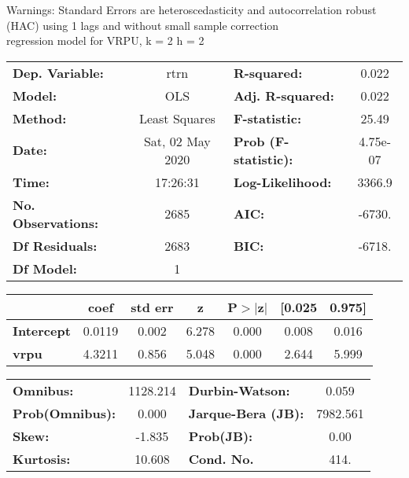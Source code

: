 Warnings: \newline
 [1] Standard Errors are heteroscedasticity and autocorrelation robust (HAC) using 1 lags and without small sample correction\\ 

regression model for VRPU, k = 2 h = 2\begin{center}
\begin{tabular}{lclc}
\toprule
\textbf{Dep. Variable:}    &       rtrn       & \textbf{  R-squared:         } &     0.022   \\
\textbf{Model:}            &       OLS        & \textbf{  Adj. R-squared:    } &     0.022   \\
\textbf{Method:}           &  Least Squares   & \textbf{  F-statistic:       } &     25.49   \\
\textbf{Date:}             & Sat, 02 May 2020 & \textbf{  Prob (F-statistic):} &  4.75e-07   \\
\textbf{Time:}             &     17:26:31     & \textbf{  Log-Likelihood:    } &    3366.9   \\
\textbf{No. Observations:} &        2685      & \textbf{  AIC:               } &    -6730.   \\
\textbf{Df Residuals:}     &        2683      & \textbf{  BIC:               } &    -6718.   \\
\textbf{Df Model:}         &           1      & \textbf{                     } &             \\
\bottomrule
\end{tabular}
\begin{tabular}{lcccccc}
                   & \textbf{coef} & \textbf{std err} & \textbf{z} & \textbf{P$> |$z$|$} & \textbf{[0.025} & \textbf{0.975]}  \\
\midrule
\textbf{Intercept} &       0.0119  &        0.002     &     6.278  &         0.000        &        0.008    &        0.016     \\
\textbf{vrpu}      &       4.3211  &        0.856     &     5.048  &         0.000        &        2.644    &        5.999     \\
\bottomrule
\end{tabular}
\begin{tabular}{lclc}
\textbf{Omnibus:}       & 1128.214 & \textbf{  Durbin-Watson:     } &    0.059  \\
\textbf{Prob(Omnibus):} &   0.000  & \textbf{  Jarque-Bera (JB):  } & 7982.561  \\
\textbf{Skew:}          &  -1.835  & \textbf{  Prob(JB):          } &     0.00  \\
\textbf{Kurtosis:}      &  10.608  & \textbf{  Cond. No.          } &     414.  \\
\bottomrule
\end{tabular}
\end{center}

